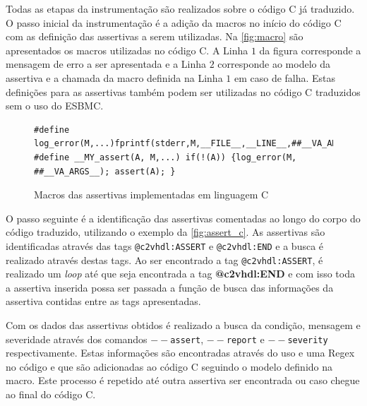 \par
Todas as etapas da instrumentação são realizados sobre o código C já traduzido. O passo inicial da instrumentação é a adição da macros no início do código C com as definição das assertivas a serem utilizadas. Na \autoref{fig:macro} são apresentados os macros utilizadas no código C. A Linha $1$ da figura corresponde a mensagem de erro a ser apresentada e a Linha $2$ corresponde ao modelo da assertiva e a chamada da macro definida na Linha $1$ em caso de falha. Estas definições para as assertivas também podem ser utilizadas no código C traduzidos sem o uso do ESBMC.


\begin{figure}[H]
\caption{\label{fig:macro} Macros das assertivas implementadas em linguagem C}
	\begin{center}
    \begin{minipage}{0.99\textwidth}
    \begin{lstlisting}       
#define log_error(M,...)fprintf(stderr,M,__FILE__,__LINE__,##__VA_ARGS__)
#define __MY_assert(A, M,...) if(!(A)) {log_error(M, ##__VA_ARGS__); assert(A); }
    \end{lstlisting}
    \end{minipage}
	\end{center}
\end{figure}

\par
O passo seguinte é a identificação das assertivas comentadas ao longo do corpo do código traduzido, utilizando o exemplo da \autoref{fig:assert_c}. As assertivas são identificadas através das tags \texttt{@c2vhdl:ASSERT} e \texttt{@c2vhdl:END} e a busca é realizado através destas tags. Ao ser encontrado a tag \texttt{@c2vhdl:ASSERT}, é realizado um \textit{loop} até que seja encontrada a tag \textbf{@c2vhdl:END} e com isso toda a assertiva inserida possa ser passada a função de busca das informações da assertiva contidas entre as tags apresentadas.

\par
Com os dados das assertivas obtidos é realizado a busca da condição, mensagem e severidade através dos comandos \texttt{$--$assert}, \texttt{$--$report} e \texttt{$--$severity} respectivamente. Estas informações são encontradas através do uso e uma Regex no código e que são adicionadas ao código C seguindo o modelo definido na macro. Este processo é repetido até outra assertiva ser encontrada ou caso chegue ao final do código C.

